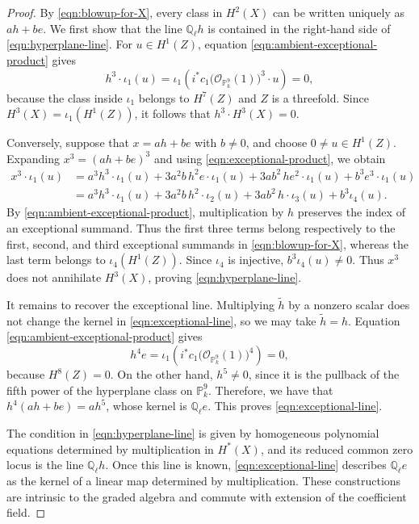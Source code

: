 \documentclass[11pt, reqno]{amsart}
\theoremstyle{definition}
\newcommand\QQ{\mathbb{Q}}
\newcommand\PP{\mathbb{P}}
\newcommand\OO{\mathcal{O}}
\begin{document}
\begin{proof}
By \eqref{eqn:blowup-for-X}, every class in $H^2(X)$ can be written
uniquely as $ah+be$.  We first show that the line $\QQ_\ell h$ is
contained in the right-hand side of \eqref{eqn:hyperplane-line}.  For
$u\in H^1(Z)$, equation \eqref{eqn:ambient-exceptional-product} gives
\[
h^3\cdot\iota_1(u)
=
\iota_1\left(
i^*c_1\bigl(\OO_{\PP^9_k}(1)\bigr)^3\cdot u
\right)
=
0,
\]
because the class inside $\iota_1$ belongs to $H^7(Z)$ and $Z$ is a
threefold.  Since $H^3(X)=\iota_1(H^1(Z))$, it follows that
$h^3\cdot H^3(X)=0$.

Conversely, suppose that $x=ah+be$ with $b\neq0$, and choose
$0\neq u\in H^1(Z)$.  
Expanding $x^3=(ah+be)^3$ and using
\eqref{eqn:exceptional-product}, we obtain
\[
\begin{aligned}
x^3\cdot\iota_1(u)
&=
a^3h^3\cdot\iota_1(u)
+3a^2b\,h^2e\cdot\iota_1(u)
+3ab^2\,he^2\cdot\iota_1(u)
+b^3e^3\cdot\iota_1(u)
\\
&=
a^3h^3\cdot\iota_1(u)
+3a^2b\,h^2\cdot\iota_2(u)
+3ab^2\,h\cdot\iota_3(u)
+b^3\iota_4(u).
\end{aligned}
\]
By \eqref{eqn:ambient-exceptional-product}, multiplication by $h$
preserves the index of an exceptional summand.  Thus the first three
terms belong respectively to the first, second, and third exceptional
summands in \eqref{eqn:blowup-for-X}, whereas the last term belongs to
$\iota_4(H^1(Z))$.  
Since $\iota_4$ is injective,
$b^3\iota_4(u)\neq0$.  Thus $x^3$ does not annihilate $H^3(X)$, proving
\eqref{eqn:hyperplane-line}.

It remains to recover the exceptional line.  Multiplying
$\widetilde h$ by a nonzero scalar does not change the kernel in
\eqref{eqn:exceptional-line}, so we may take $\widetilde h=h$.  Equation
\eqref{eqn:ambient-exceptional-product} gives
\[
h^4e
=
\iota_1\left(
i^*c_1\bigl(\OO_{\PP^9_k}(1)\bigr)^4
\right)
=
0,
\]
because $H^8(Z)=0$.  On the other hand, $h^5\neq0$, since it is the
pullback of the fifth power of the hyperplane class on $\PP^9_k$.
Therefore, we have that $h^4(ah+be)=ah^5$, whose kernel is $\QQ_\ell e$.  This proves
\eqref{eqn:exceptional-line}.

The condition in \eqref{eqn:hyperplane-line} is given by homogeneous
polynomial equations determined by multiplication in $H^*(X)$, and its
reduced common zero locus is the line $\QQ_\ell h$.  Once this line is
known, \eqref{eqn:exceptional-line} describes $\QQ_\ell e$ as the
kernel of a linear map determined by multiplication.  These
constructions are intrinsic to the graded algebra and commute with
extension of the coefficient field.
\end{proof}
\end{document}
